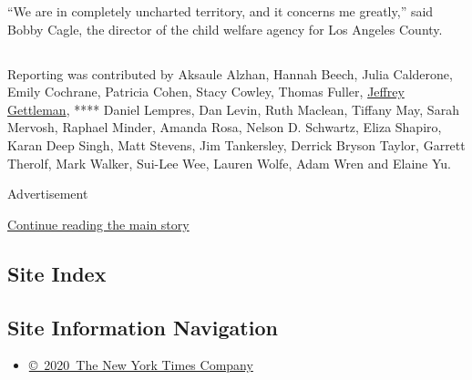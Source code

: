 ``We are in completely uncharted territory, and it concerns me
greatly,'' said Bobby Cagle, the director of the child welfare agency
for Los Angeles County.

\hypertarget{-9}{%
\subsection{}\label{-9}}

Reporting was contributed by Aksaule Alzhan, Hannah Beech, Julia
Calderone, Emily Cochrane, Patricia Cohen, Stacy Cowley, Thomas Fuller,
\href{https://www.nytimes3xbfgragh.onion/by/jeffrey-gettleman}{Jeffrey
Gettleman}, **** Daniel Lempres, Dan Levin, Ruth Maclean, Tiffany May,
Sarah Mervosh, Raphael Minder, Amanda Rosa, Nelson D. Schwartz, Eliza
Shapiro, Karan Deep Singh, Matt Stevens, Jim Tankersley, Derrick Bryson
Taylor, Garrett Therolf, Mark Walker, Sui-Lee Wee, Lauren Wolfe, Adam
Wren and Elaine Yu.

Advertisement

\protect\hyperlink{after-bottom}{Continue reading the main story}

\hypertarget{site-index}{%
\subsection{Site Index}\label{site-index}}

\hypertarget{site-information-navigation}{%
\subsection{Site Information
Navigation}\label{site-information-navigation}}

\begin{itemize}
\tightlist
\item
  \href{https://help.nytimes3xbfgragh.onion/hc/en-us/articles/115014792127-Copyright-notice}{©~2020~The
  New York Times Company}
\end{itemize}

